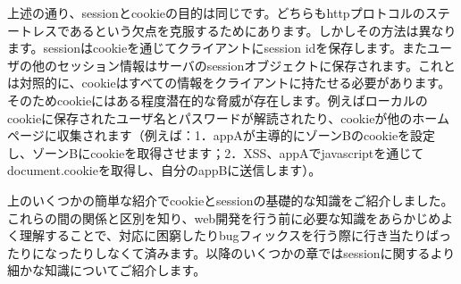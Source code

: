 上述の通り、sessionとcookieの目的は同じです。どちらもhttpプロトコルのステートレスであるという欠点を克服するためにあります。しかしその方法は異なります。sessionはcookieを通じてクライアントにsession idを保存します。またユーザの他のセッション情報はサーバのsessionオブジェクトに保存されます。これとは対照的に、cookieはすべての情報をクライアントに持たせる必要があります。そのためcookieにはある程度潜在的な脅威が存在します。例えばローカルのcookieに保存されたユーザ名とパスワードが解読されたり、cookieが他のホームページに収集されます（例えば：1．appAが主導的にゾーンBのcookieを設定し、ゾーンBにcookieを取得させます；2．XSS、appAでjavascriptを通じてdocument.cookieを取得し、自分のappBに送信します）。

上のいくつかの簡単な紹介でcookieとsessionの基礎的な知識をご紹介しました。これらの間の関係と区別を知り、web開発を行う前に必要な知識をあらかじめよく理解することで、対応に困窮したりbugフィックスを行う際に行き当たりばったりになったりしなくて済みます。以降のいくつかの章ではsessionに関するより細かな知識についてご紹介します。

